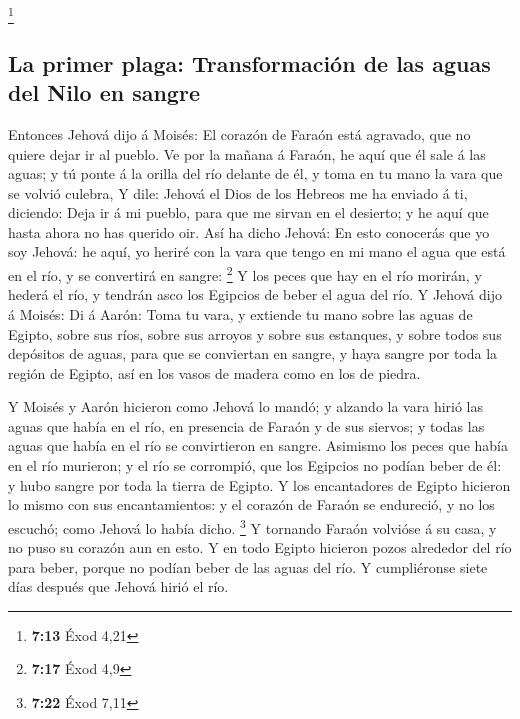 \footnote{\textbf{7:13} Éxod 4,21}

\hypertarget{la-primer-plaga-transformaciuxf3n-de-las-aguas-del-nilo-en-sangre}{%
\subsection{La primer plaga: Transformación de las aguas del Nilo en
sangre}\label{la-primer-plaga-transformaciuxf3n-de-las-aguas-del-nilo-en-sangre}}

 Entonces Jehová dijo á Moisés: El corazón de Faraón está
agravado, que no quiere dejar ir al pueblo.  Ve por la
mañana á Faraón, he aquí que él sale á las aguas; y tú ponte á la orilla
del río delante de él, y toma en tu mano la vara que se volvió culebra,
 Y dile: Jehová el Dios de los Hebreos me ha enviado á
ti, diciendo: Deja ir á mi pueblo, para que me sirvan en el desierto; y
he aquí que hasta ahora no has querido oir.  Así ha dicho
Jehová: En esto conocerás que yo soy Jehová: he aquí, yo heriré con la
vara que tengo en mi mano el agua que está en el río, y se convertirá en
sangre: \footnote{\textbf{7:17} Éxod 4,9}  Y los peces
que hay en el río morirán, y hederá el río, y tendrán asco los Egipcios
de beber el agua del río.  Y Jehová dijo á Moisés: Di á
Aarón: Toma tu vara, y extiende tu mano sobre las aguas de Egipto, sobre
sus ríos, sobre sus arroyos y sobre sus estanques, y sobre todos sus
depósitos de aguas, para que se conviertan en sangre, y haya sangre por
toda la región de Egipto, así en los vasos de madera como en los de
piedra.

 Y Moisés y Aarón hicieron como Jehová lo mandó; y
alzando la vara hirió las aguas que había en el río, en presencia de
Faraón y de sus siervos; y todas las aguas que había en el río se
convirtieron en sangre.  Asimismo los peces que había en
el río murieron; y el río se corrompió, que los Egipcios no podían beber
de él: y hubo sangre por toda la tierra de Egipto.  Y los
encantadores de Egipto hicieron lo mismo con sus encantamientos: y el
corazón de Faraón se endureció, y no los escuchó; como Jehová lo había
dicho. \footnote{\textbf{7:22} Éxod 7,11}  Y tornando
Faraón volvióse á su casa, y no puso su corazón aun en esto.
 Y en todo Egipto hicieron pozos alrededor del río para
beber, porque no podían beber de las aguas del río.  Y
cumpliéronse siete días después que Jehová hirió el río.

